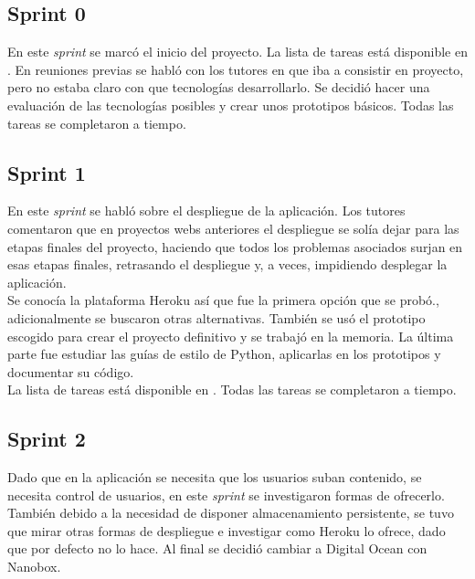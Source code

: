 \subsection{Sprint 0}
En este \textit{sprint} se marcó el inicio del proyecto. La lista de tareas está
disponible en
. En reuniones previas se habló con los tutores en que iba a consistir en
proyecto, pero no estaba claro con que tecnologías desarrollarlo. Se decidió
hacer una evaluación de las tecnologías posibles y crear unos prototipos
básicos. Todas las tareas se completaron a tiempo.\\

\subsection{Sprint 1}
En este \textit{sprint} se habló sobre el despliegue de la aplicación. Los
tutores comentaron que en proyectos webs anteriores el despliegue se solía dejar
para las etapas finales del proyecto, haciendo que todos los problemas asociados
surjan en esas etapas finales, retrasando el despliegue y, a veces, impidiendo
desplegar la aplicación.\\

Se conocía la plataforma Heroku así que fue la primera opción que se probó., 
adicionalmente se buscaron otras alternativas. También se usó el prototipo 
escogido para crear el proyecto definitivo y se trabajó en la memoria. La 
última parte fue estudiar las guías de estilo de Python, aplicarlas en los 
prototipos y documentar su código.\\

La lista de tareas está disponible en
. Todas las tareas se completaron a tiempo.\\

\subsection{Sprint 2}
Dado que en la aplicación se necesita que los usuarios suban contenido, se
necesita control de usuarios, en este \textit{sprint} se investigaron formas de
ofrecerlo. También debido a la necesidad de disponer almacenamiento persistente,
se tuvo que mirar otras formas de despliegue e investigar como Heroku lo 
ofrece, dado que por defecto no lo hace. Al final se decidió cambiar a 
Digital Ocean con Nanobox.\\

